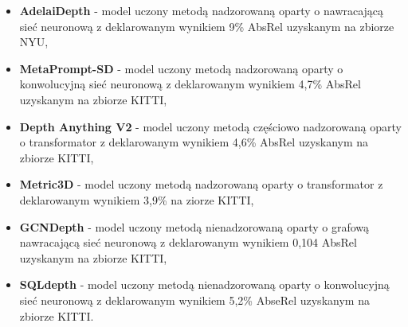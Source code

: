 \begin{itemize} 
    \item \textbf{AdelaiDepth} - model uczony metodą nadzorowaną oparty o nawracającą sieć neuronową z deklarowanym wynikiem 9\% AbsRel uzyskanym na zbiorze NYU,
    \item \textbf{MetaPrompt-SD} - model uczony metodą nadzorowaną oparty o konwolucyjną sieć neuronową z deklarowanym wynikiem 4,7\% AbsRel uzyskanym na zbiorze KITTI, 
    \item \textbf{Depth Anything V2} - model uczony metodą częściowo nadzorowaną oparty o transformator z deklarowanym wynikiem 4,6\% AbsRel uzyskanym na zbiorze KITTI, 
    \item \textbf{Metric3D} - model uczony metodą nadzorowaną oparty o transformator z deklarowanym wynikiem 3,9\% na ziorze KITTI, 
    \item \textbf{GCNDepth} - model uczony metodą nienadzorowaną oparty o grafową nawracającą sieć neuronową z deklarowanym wynikiem 0,104 AbsRel uzyskanym na zbiorze KITTI,
    \item \textbf{SQLdepth} - model uczony metodą nienadzorowaną oparty o konwolucyjną sieć neuronową z deklarowanym wynikiem 5,2\% AbseRel uzyskanym na zbiorze KITTI.
\end{itemize}